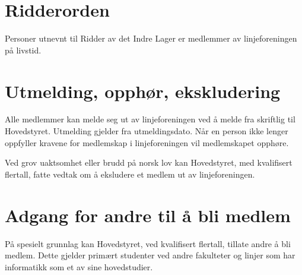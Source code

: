 \section{Ridderorden} 
Personer utnevnt til Ridder av det Indre Lager er medlemmer av linjeforeningen på livstid.

\section{Utmelding, opphør, ekskludering}
Alle medlemmer kan melde seg ut av linjeforeningen ved å melde fra skriftlig til \mbox{Hovedstyret}. Utmelding gjelder fra utmeldingsdato. Når en person ikke lenger \linebreak oppfyller kravene for medlemskap i linjeforeningen vil medlemskapet opphøre. \newline

Ved grov uaktsomhet eller brudd på norsk lov kan Hovedstyret, med kvalifisert \linebreak flertall, fatte vedtak om å eksludere et medlem ut av linjeforeningen. \newline

\section{Adgang for andre til å bli medlem}

På spesielt grunnlag kan Hovedstyret, ved kvalifisert flertall, tillate andre å bli medlem. Dette gjelder primært studenter ved andre fakulteter og linjer som har informatikk som et av sine hovedstudier. 